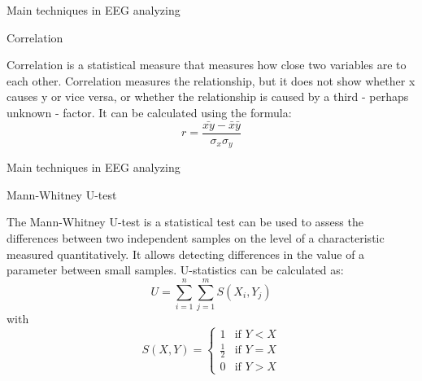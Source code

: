 \documentclass{beamer}
\begin{document}

\begin{frame}
{\centerline{Main techniques in EEG analyzing}}
{\centerline{Correlation}}
Correlation is a statistical measure that measures how close two variables are to each other. Correlation measures the relationship, but it does not show whether x causes y or vice versa, or whether the relationship is caused by a third - perhaps unknown - factor. It can be calculated using the formula:
\begin{equation}
    r=\frac{\bar{xy}-\bar{x}\bar{y}}{\sigma_{x}\sigma_{y}}
\end{equation}
\end{frame}

\begin{frame}
{\centerline{Main techniques in EEG analyzing}}
{\centerline{Mann-Whitney U-test}}

The Mann-Whitney U-test is a statistical test can be used to assess the differences between two independent samples on the level of a characteristic measured quantitatively. It allows detecting differences in the value of a parameter between small samples. U-statistics can be calculated as:
\begin{equation}
    U=\sum_{i=1}^{n}\sum_{j=1}^{m} S(X_{i}, Y_{j})
\end{equation}
with 
\begin{equation}
    S(X,Y)=
    \begin{cases}
        1 & \text{if $Y<X$} \\
        \frac{1}{2} & \text{if $Y=X$} \\
        0 & \text{if $Y>X$}
    \end{cases}
\end{equation}
    
\end{frame}
\end{document}
